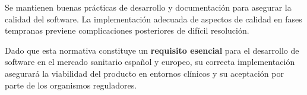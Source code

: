 Se mantienen buenas prácticas de desarrollo y documentación para asegurar la calidad del software. La implementación adecuada de aspectos de calidad en fases tempranas previene complicaciones posteriores de difícil resolución.

Dado que esta normativa constituye un \textbf{requisito esencial} para el desarrollo de software en el mercado sanitario español y europeo, su correcta implementación asegurará la viabilidad del producto en entornos clínicos y su aceptación por parte de los organismos reguladores.
